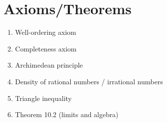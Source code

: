 \documentclass[12pt]{amsart}
\begin{document}
\section*{Axioms/Theorems}

\begin{enumerate}
	\item Well-ordering axiom
	\item Completeness axiom
	\item Archimedean principle
	\item Density of rational numbers / irrational numbers


	\item Triangle inequality

	\item Theorem 10.2 (limits and algebra)
		\begin{comment}
	\item Squeeze Theorem
	\item Monotone convergence theorem

	\item Principle of induction
					
	\item Theorem on convergence and subsequences
	\item Cantor's Theorem

	\item Bolzano-Weierstrass

	\item Main corollary of Bolzano-Weierstrass
	

	\item Theorem on limits and sequences
	\item Theorem on limits of functions and algebra
	\item Squeeze Theorem for functions


	\item Theorem on continuity and limits
	
	\item Theorem on continuity and algebra
	\item Theorem on continuity and compositions
			\item Intermediate Value Theorem
	\item Boundedness Theorem
	\item Extreme Value Theorem
	

	\item Derivatives and algebra 
		\item Derivatives and minima/maxima
	\item Mean Value Theorem
	\item Increasing/decreasing functions and derivatives
\end{comment}
\end{enumerate}
\end{document}
